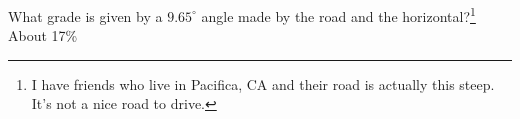 { What grade is given by a $9.65^{\circ}$ angle made by the road and the horizontal?\footnote{I have friends who live in Pacifica, CA and their road is actually this steep.  It's not a nice road to drive.}}
{About 17\%}
